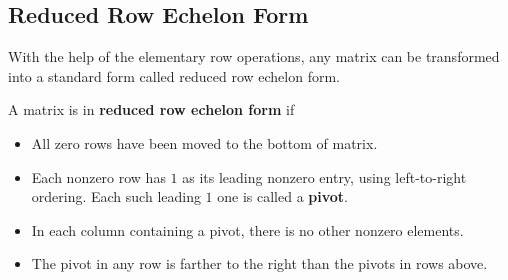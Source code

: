 \documentclass[aima104_lecturenotes_ku.tex]{subfiles}
\begin{document}
\subsection{Reduced Row Echelon Form}
With the help of the elementary row operations, any matrix can be transformed into a standard form called reduced row echelon form.
\begin{mdframed}[style=myframe]
        A matrix is in \textbf{reduced row echelon form} if
        \begin{itemize}
            \item All zero rows have been moved to the bottom of matrix.
            \item Each nonzero row has $1$ as its leading nonzero entry, using left-to-right ordering. Each such leading $1$ one is called a \textbf{pivot}.
            \item In each column containing a pivot, there is no other nonzero elements.
            \item The pivot in any row is farther to the right than the pivots in rows above.
        \end{itemize}
\end{mdframed}
\end{document}
